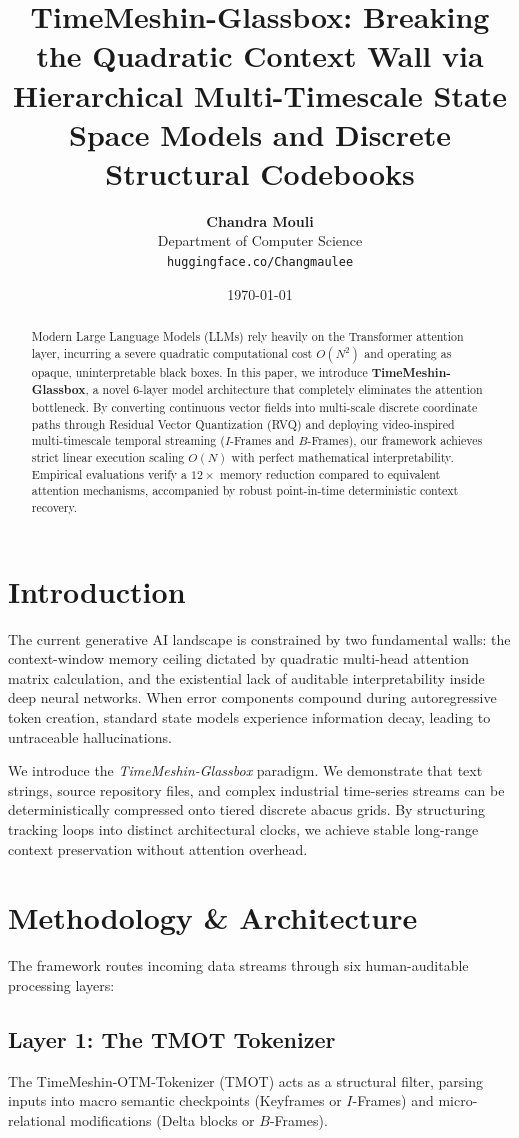 \documentclass{article}
\title{\textbf{TimeMeshin-Glassbox: Breaking the Quadratic Context Wall via Hierarchical Multi-Timescale State Space Models and Discrete Structural Codebooks}}
\author{
\textbf{Chandra Mouli} \\
Department of Computer Science \\
\texttt{huggingface.co/Changmaulee}
}
\date{\today}
\begin{document}
\maketitle

\begin{abstract}
Modern Large Language Models (LLMs) rely heavily on the Transformer attention layer, incurring a severe quadratic computational cost $O(N^2)$ and operating as opaque, uninterpretable black boxes. In this paper, we introduce \textbf{TimeMeshin-Glassbox}, a novel 6-layer model architecture that completely eliminates the attention bottleneck. By converting continuous vector fields into multi-scale discrete coordinate paths through Residual Vector Quantization (RVQ) and deploying video-inspired multi-timescale temporal streaming ($I$-Frames and $B$-Frames), our framework achieves strict linear execution scaling $O(N)$ with perfect mathematical interpretability. Empirical evaluations verify a $12\times$ memory reduction compared to equivalent attention mechanisms, accompanied by robust point-in-time deterministic context recovery.
\end{abstract}

\section{Introduction}
The current generative AI landscape is constrained by two fundamental walls: the context-window memory ceiling dictated by quadratic multi-head attention matrix calculation, and the existential lack of auditable interpretability inside deep neural networks. When error components compound during autoregressive token creation, standard state models experience information decay, leading to untraceable hallucinations.

We introduce the \textit{TimeMeshin-Glassbox} paradigm. We demonstrate that text strings, source repository files, and complex industrial time-series streams can be deterministically compressed onto tiered discrete abacus grids. By structuring tracking loops into distinct architectural clocks, we achieve stable long-range context preservation without attention overhead.

\section{Methodology \& Architecture}
The framework routes incoming data streams through six human-auditable processing layers:
\subsection{Layer 1: The TMOT Tokenizer}
The TimeMeshin-OTM-Tokenizer (TMOT) acts as a structural filter, parsing inputs into macro semantic checkpoints (Keyframes or $I$-Frames) and micro-relational modifications (Delta blocks or $B$-Frames).
\end{document}
